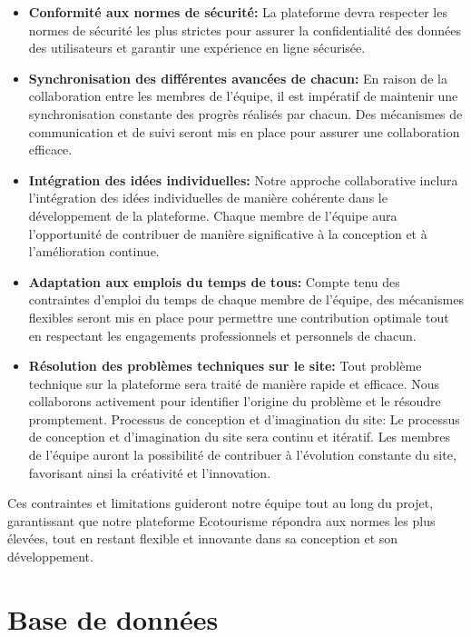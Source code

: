 \documentclass[mstat,12pt]{unswthesis}
\begin{document}
\begin{adjustwidth}{-2cm}{}
\begin{itemize}
\tightlist
\item
  \textbf{Conformité aux normes de sécurité:} La plateforme devra
  respecter les normes de sécurité les plus strictes pour assurer la
  confidentialité des données des utilisateurs et garantir une
  expérience en ligne sécurisée.
\item
  \textbf{Synchronisation des différentes avancées de chacun:} En raison
  de la collaboration entre les membres de l'équipe, il est impératif de
  maintenir une synchronisation constante des progrès réalisés par
  chacun. Des mécanismes de communication et de suivi seront mis en
  place pour assurer une collaboration efficace.
\item
  \textbf{Intégration des idées individuelles:} Notre approche
  collaborative inclura l'intégration des idées individuelles de manière
  cohérente dans le développement de la plateforme. Chaque membre de
  l'équipe aura l'opportunité de contribuer de manière significative à
  la conception et à l'amélioration continue.
\item
  \textbf{Adaptation aux emplois du temps de tous:} Compte tenu des
  contraintes d'emploi du temps de chaque membre de l'équipe, des
  mécanismes flexibles seront mis en place pour permettre une
  contribution optimale tout en respectant les engagements
  professionnels et personnels de chacun.
\item
  \textbf{Résolution des problèmes techniques sur le site:} Tout
  problème technique sur la plateforme sera traité de manière rapide et
  efficace. Nous collaborons activement pour identifier l'origine du
  problème et le résoudre promptement. Processus de conception et
  d'imagination du site: Le processus de conception et d'imagination du
  site sera continu et itératif. Les membres de l'équipe auront la
  possibilité de contribuer à l'évolution constante du site, favorisant
  ainsi la créativité et l'innovation.
\end{itemize}

Ces contraintes et limitations guideront notre équipe tout au long du
projet, garantissant que notre plateforme Ecotourisme répondra aux
normes les plus élevées, tout en restant flexible et innovante dans sa
conception et son développement.

\hypertarget{base-de-donnuxe9es}{%
\chapter{Base de données}\label{base-de-donnuxe9es}}


\end{adjustwidth}
\end{document}
